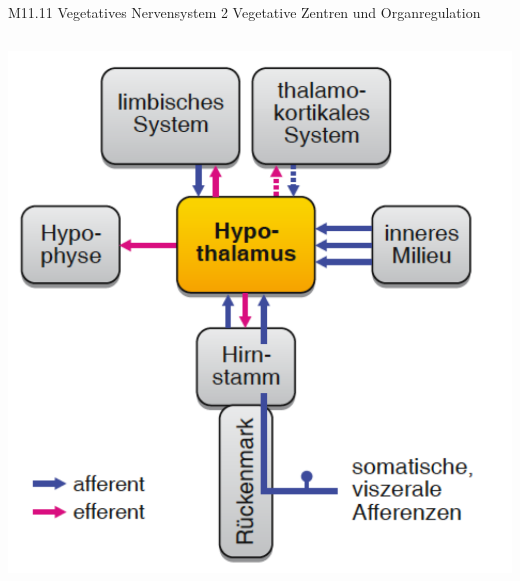\documentclass{beamer}
\begin{document}
\begin{frame}{M11.11 Vegetatives Nervensystem 2 Vegetative Zentren und Organregulation}
\begin{columns}[c]
\begin{column}{5cm}
    \begin{center}
        \includegraphics[width=\textwidth]{hypothalamus_nabel_der_welt.png}
    \end{center}
    
    
    
    \end{column}


    
    
    \end{columns}
    
    
    
\end{frame}
\end{document}
